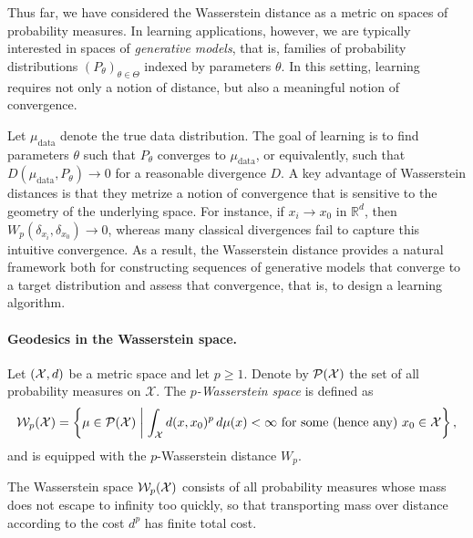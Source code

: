 
\begin{remark}
Thus far, we have considered the Wasserstein distance as a metric on spaces of
probability measures. In learning applications, however, we are typically
interested in spaces of \emph{generative models}, that is, families of probability
distributions $(P_\theta)_{\theta\in\Theta}$ indexed by parameters $\theta$. In
this setting, learning requires not only a notion of distance, but also a
meaningful notion of convergence.

Let $\mu_{\text{data}}$ denote the true data distribution. The goal of learning is
to find parameters $\theta$ such that $P_\theta$ converges to $\mu_{\text{data}}$,
or equivalently, such that $D(\mu_{\text{data}},P_\theta)\to 0$ for a reasonable
divergence $D$. A key advantage of Wasserstein distances is that they metrize a
notion of convergence that is sensitive to the geometry of the underlying space.
For instance, if $x_i\to x_0$ in $\mathbb{R}^d$, then $W_p(\delta_{x_i},\delta_{x_0})
\to 0$, whereas many classical divergences fail to capture this intuitive
convergence. As a result, the Wasserstein distance provides a natural framework both for constructing sequences of generative models that converge to a target distribution and assess that convergence, that is, to design a learning algorithm.


\end{remark}


\paragraph{Geodesics in the Wasserstein space.}

\begin{definition}
Let $({\mathcal X},d)$ be a metric space and let $p\ge 1$. Denote by
${\mathcal P}({\mathcal X})$ the set of all probability measures on $\mathcal X$.
The \emph{$p$-Wasserstein space} is defined as
\[
\mathcal W_p(\mathcal X)
=
\left\{
\mu \in {\mathcal P}(\mathcal X)
\;\middle|\;
\int_{{\mathcal X}} d(x,x_0)^p\,d\mu(x) < \infty
\ \text{for some (hence any) } x_0\in\mathcal X
\right\},
\]
and is equipped with the $p$-Wasserstein distance $W_p$.
\end{definition}

\begin{remark}[Intuition]
The Wasserstein space $\mathcal W_p({\mathcal X})$ consists of all probability
measures whose mass does not escape to infinity too quickly, so that transporting
mass over distance according to the cost $d^p$ has finite total cost.
\end{remark}


